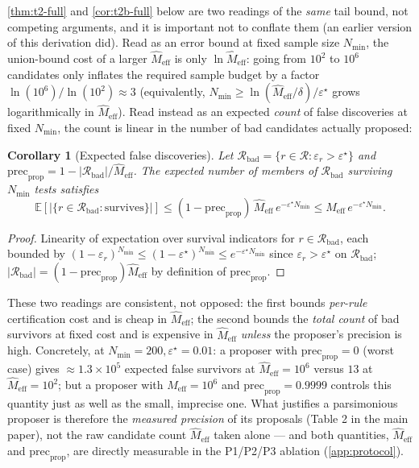 \documentclass[11pt]{article}
\newcommand{\E}{\mathbb{E}}
\theoremstyle{plain}
\newtheorem{corollary}[theorem]{Corollary}
\theoremstyle{definition}
\theoremstyle{remark}
\begin{document}
\autoref{thm:t2-full} and \autoref{cor:t2b-full} below are two readings of the \emph{same} tail bound, not competing arguments, and it is important not to conflate them (an earlier version of this derivation did). Read as an error bound at fixed sample size $N_{\min}$, the union-bound cost of a larger $\hat M_{\mathrm{eff}}$ is only $\ln\hat M_{\mathrm{eff}}$: going from $10^2$ to $10^6$ candidates only inflates the required sample budget by a factor $\ln(10^6)/\ln(10^2)\approx3$ (equivalently, $N_{\min}\ge\ln(\hat M_{\mathrm{eff}}/\delta)/\varepsilon^\star$ grows logarithmically in $\hat M_{\mathrm{eff}}$). Read instead as an expected \emph{count} of false discoveries at fixed $N_{\min}$, the count is linear in the number of bad candidates actually proposed:

\begin{corollary}[Expected false discoveries]
\label{cor:t2b-full}
Let $\mathcal{R}_{\mathrm{bad}}=\{r\in\mathcal{R}:\varepsilon_r>\varepsilon^\star\}$ and $\mathrm{prec}_{\mathrm{prop}}=1-|\mathcal{R}_{\mathrm{bad}}|/\hat M_{\mathrm{eff}}$. The expected number of members of $\mathcal{R}_{\mathrm{bad}}$ surviving $N_{\min}$ tests satisfies
$$\E[|\{r\in\mathcal{R}_{\mathrm{bad}}:\text{survives}\}|]\le (1-\mathrm{prec}_{\mathrm{prop}})\,\hat M_{\mathrm{eff}}\, e^{-\varepsilon^\star N_{\min}} \le \hat M_{\mathrm{eff}}\, e^{-\varepsilon^\star N_{\min}}.$$
\end{corollary}
\begin{proof}
Linearity of expectation over survival indicators for $r\in\mathcal{R}_{\mathrm{bad}}$, each bounded by $(1-\varepsilon_r)^{N_{\min}}\le(1-\varepsilon^\star)^{N_{\min}}\le e^{-\varepsilon^\star N_{\min}}$ since $\varepsilon_r>\varepsilon^\star$ on $\mathcal{R}_{\mathrm{bad}}$; $|\mathcal{R}_{\mathrm{bad}}|=(1-\mathrm{prec}_{\mathrm{prop}})\hat M_{\mathrm{eff}}$ by definition of $\mathrm{prec}_{\mathrm{prop}}$.
\end{proof}
These two readings are consistent, not opposed: the first bounds \emph{per-rule} certification cost and is cheap in $\hat M_{\mathrm{eff}}$; the second bounds the \emph{total count} of bad survivors at fixed cost and is expensive in $\hat M_{\mathrm{eff}}$ \emph{unless} the proposer's precision is high. Concretely, at $N_{\min}=200,\varepsilon^\star=0.01$: a proposer with $\mathrm{prec}_{\mathrm{prop}}=0$ (worst case) gives $\approx1.3\times10^5$ expected false survivors at $\hat M_{\mathrm{eff}}=10^6$ versus $13$ at $\hat M_{\mathrm{eff}}=10^2$; but a proposer with $\hat M_{\mathrm{eff}}=10^6$ and $\mathrm{prec}_{\mathrm{prop}}=0.9999$ controls this quantity just as well as the small, imprecise one. What justifies a parsimonious proposer is therefore the \emph{measured precision} of its proposals (Table 2 in the main paper), not the raw candidate count $\hat M_{\mathrm{eff}}$ taken alone --- and both quantities, $\hat M_{\mathrm{eff}}$ and $\mathrm{prec}_{\mathrm{prop}}$, are directly measurable in the P1/P2/P3 ablation (\autoref{app:protocol}).
\end{document}
